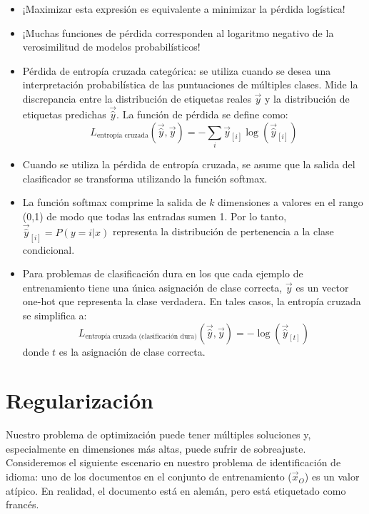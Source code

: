 \begin{itemize}
 \item ¡Maximizar esta expresión es equivalente a minimizar la pérdida logística!

 \item ¡Muchas funciones de pérdida corresponden al logaritmo negativo de la verosimilitud de modelos probabilísticos!



\item Pérdida de entropía cruzada categórica: se utiliza cuando se desea una interpretación probabilística de las puntuaciones de múltiples clases. Mide la discrepancia entre la distribución de etiquetas reales $\vec{y}$ y la distribución de etiquetas predichas $\vec{\hat{y}}$. La función de pérdida se define como:
\begin{displaymath}
L_{\text{entropía cruzada}}(\vec{\hat{y}},\vec{y}) = - \sum_{i} \vec{y}_{[i]} \log(\vec{\hat{y}}_{[i]})
\end{displaymath}

\item Cuando se utiliza la pérdida de entropía cruzada, se asume que la salida del clasificador se transforma utilizando la función softmax.

\item La función softmax comprime la salida de $k$ dimensiones a valores en el rango (0,1) de modo que todas las entradas sumen 1. Por lo tanto, $\vec{\hat{y}}_{[i]} = P(y = i |x)$ representa la distribución de pertenencia a la clase condicional.

\item Para problemas de clasificación dura en los que cada ejemplo de entrenamiento tiene una única asignación de clase correcta, $\vec{y}$ es un vector one-hot que representa la clase verdadera. En tales casos, la entropía cruzada se simplifica a:
\begin{displaymath}
L_{\text{entropía cruzada (clasificación dura)}}(\vec{\hat{y}},\vec{y}) = -\log(\vec{\hat{y}}_{[t]})
\end{displaymath}
donde $t$ es la asignación de clase correcta.

\end{itemize}

\section{Regularización}
Nuestro problema de optimización puede tener múltiples soluciones y, especialmente en dimensiones más altas, puede sufrir de sobreajuste. Consideremos el siguiente escenario en nuestro problema de identificación de idioma: uno de los documentos en el conjunto de entrenamiento ($\vec{x}_O$) es un valor atípico. En realidad, el documento está en alemán, pero está etiquetado como francés.

